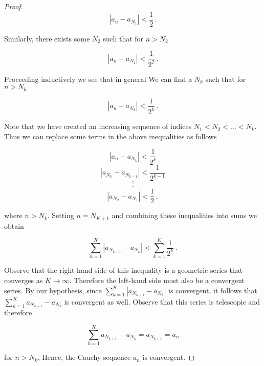 \documentclass[a4paper]{article}
\newcommand {\m} {\cdot}
\numberwithin{equation}{section}
\begin{document}
\begin{description}
\begin{proof}
$$|a_n - a_{N_1}| < \frac{1}{2}\,.$$

Similarly, there exists some $N_2$ such that for $n > N_2$

$$|a_n - a_{N_2}| < \frac{1}{2^2}\,.$$

Proceeding inductively we see that in general We can find a $N_k$ such that for $n > N_k$

$$|a_n - a_{N_k}| < \frac{1}{2^k}\,.$$

Note that we have created an increasing sequence of indices $N_1 < N_2 < ... < N_k$. Thus we can replace some terms in the above inequalities as follows

	$$|a_n - a_{N_k}| < \frac{1}{2^k}$$
	$$|a_{N_k} - a_{N_{k-1}}| < \frac{1}{2^{k-1}}$$
	$$\m$$
	$$\m$$
	$$\m$$
	$$|a_{N_2} - a_{N_{1}}| < \frac{1}{2}\,,$$
	
	where $n > N_k$. Setting $n = N_{K+1}$ and  combining these inequalities into sums we obtain
	
	$$\sum_{k=1}^K |a_{N_{k+1}} - a_{N_{k}}| < \sum_{k=1}^K \frac{1}{2^k}\,.$$
	
	Observe that the right-hand side of this inequality is a geometric series that converges as $K \rightarrow \infty$. Therefore the left-hand side must also be a convergent series. By our hypothesis, since $\sum_{k=1}^K |a_{N_{k+1}} - a_{N_{k}}|$ is convergent, it follows that $\sum_{k=1}^K a_{N_{k+1}} - a_{N_{k}}$ is convergent as well.  Observe that this series is telescopic and therefore
	
	$$\sum_{k=1}^K a_{N_{k+1}} - a_{N_{k}} = a_{N_{k+1}} = a_n$$
	
	for $n > N_{k}$. Hence, the Cauchy sequence ${a_n}$ is convergent.

\end{proof}

\end{description}
\end{document}
